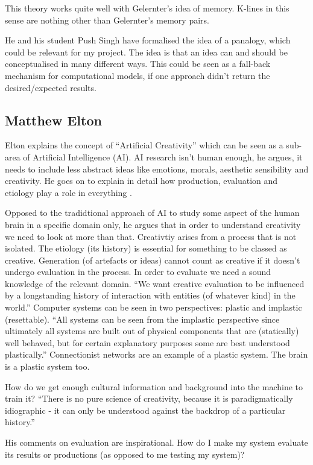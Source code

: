 This theory works quite well with Gelernter's idea of memory. K-lines in this sense are nothing other than Gelernter's memory pairs.

He and his student Push Singh have formalised the idea of a panalogy, which could be relevant for my project. The idea is that an idea can and should be conceptualised in many different ways. This could be seen as a fall-back mechanism for computational models, if one approach didn't return the desired/expected results.

\subsection{Matthew Elton}

Elton explains the concept of ``Artificial Creativity'' which can be seen as a sub-area of Artificial Intelligence (AI). AI research isn't human enough, he argues, it needs to include less abstract ideas like emotions, morals, aesthetic sensibility and creativity. He goes on to explain in detail how production, evaluation and etiology play a role in everything \citep{Elton1995}.

Opposed to the tradidtional approach of AI to study  some aspect of the human brain in a specific domain only, he argues that in order to understand creativity we need to look at more than that. Creativtiy arises from a process that is not isolated. The etiology (its history) is essential for something to be classed as creative. Generation (of artefacts or ideas) cannot count as creative if it doesn't undergo evaluation in the process. In order to evaluate we need a sound knowledge of the relevant domain. ``We want creative evaluation to be influenced by a longstanding history of interaction with entities (of whatever kind) in the world.'' Computer systems can be seen in two perspectives: plastic and implastic (resettable). ``All systems can be seen from the implastic perspective since ultimately all systems are built out of physical components that are (statically) well behaved, but for certain explanatory purposes some are best understood plastically.'' Connectionist networks are an example of a plastic system. The brain is a plastic system too.

How do we get enough cultural information and background into the machine to train it? ``There is no pure science of creativity, because it is paradigmatically idiographic - it can only be understood against the backdrop of a particular history.''

His comments on evaluation are inspirational. How do I make my system evaluate its results or productions (as opposed to me testing my system)?

